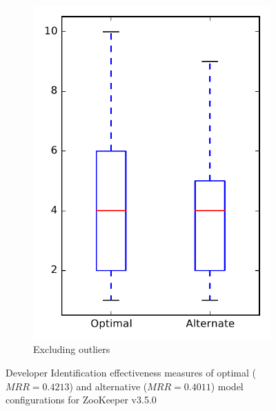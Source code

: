 \begin{figure}
\begin{subfigure}{.4\textwidth}
        \includegraphics[height=0.4\textheight]{figures/combo/dit_rq1_zookeeper_no_outlier}
        \caption{Excluding outliers}\label{fig:combo:dit:rq1:zookeeper_no_outlier}
    \end{subfigure}
\caption{Developer Identification effectiveness measures of optimal ($MRR=0.4213$) and alternative ($MRR=0.4011$) model configurations for ZooKeeper v3.5.0}
\label{fig:combo:dit:rq1:zookeeper}
\end{figure}
